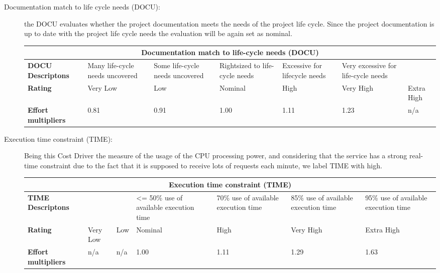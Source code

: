 \begin{description}
\item[Documentation match to life cycle needs (DOCU):] the DOCU evaluates whether the project documentation meets the needs of the project life cycle. Since the project documentation is up to date with the project life cycle needs the evaluation will be again set as nominal.

\begin{tabular}{|p{}|p{}|p{}|p{}|p{}|p{}|p{}|}
\hline
         \multicolumn{7}{|c|}{\textbf{Documentation match to life-cycle needs  (DOCU)}} \\ \hline  \hline
         	\textbf{DOCU Descriptons} &Many life-cycle needs uncovered & Some life-cycle needs uncovered & Rightsized to life-cycle needs &  Excessive for lifecycle needs & Very excessive for life-cycle needs &\\ \hline
	\textbf{Rating}&Very Low & Low & Nominal  & High & Very High &Extra High\\ \hline
	\textbf{Effort multipliers} & 0.81 & 0.91 & 1.00 & 1.11 & 1.23 &  n/a \\ \hline
\end{tabular}

\item[Execution time constraint (TIME):] Being this Cost Driver the measure of the usage of the CPU processing power, and considering that the service has a strong real-time constraint due to the fact that it is supposed to receive lots of requests each minute, we label TIME with high.

\begin{tabular}{|p{}|p{}|p{}|p{}|p{}|p{}|p{}|}
\hline
         \multicolumn{7}{|c|}{\textbf{Execution time constraint (TIME)}} \\ \hline  \hline
         	\textbf{TIME Descriptons} & & & <= 50\% use of available execution time& 70\% use of available execution time& 85\% use of available execution time &95\% use of available execution time\\ \hline
	\textbf{Rating}&Very Low & Low & Nominal  & High & Very High &Extra High\\ \hline
	\textbf{Effort multipliers} & n/a & n/a & 1.00 & 1.11 & 1.29 & 1.63 \\ \hline
\end{tabular}


\end{description}

